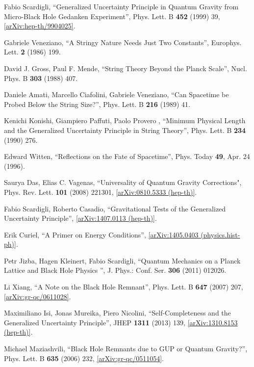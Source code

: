 \documentclass[12pt]{article}
\newcommand{\2}{$^2$}
\newcommand{\3}{$^3$}
\newcommand{\4}{$_4$}
\newcommand{\5}{$_5$}
\begin{document}
\begin{thebibliography}{400}
 Fabio Scardigli, ``Generalized Uncertainty Principle in Quantum Gravity from Micro-Black Hole Gedanken Experiment'', Phys. Lett. B \textbf{452} (1999) 39, \href{http://arxiv.org/abs/hep-th/9904025}{[arXiv:hep-th/9904025]}. 

 Gabriele Veneziano, ``A Stringy Nature Needs Just Two Constants'', Europhys. Lett. \textbf{2} (1986) 199. 

 David J. Gross, Paul F. Mende, ``String Theory Beyond the Planck Scale'', Nucl. Phys. B \textbf{303} (1988) 407.

 Daniele Amati, Marcello Ciafolini, Gabriele Veneziano, ``Can Spacetime be Probed Below the String Size?'', Phys. Lett. B \textbf{216} (1989) 41.

 Kenichi Konishi, Giampiero Paffuti, Paolo Provero , ``Minimum Physical Length and the Generalized Uncertainty Principle in String Theory'', Phys. Lett. B \textbf{234} (1990) 276.

 Edward Witten, ``Reflections on the Fate of Spacetime'', Phys. Today \textbf{49},  Apr. 24 (1996). 

 Saurya Das, Elias C. Vagenas, ``Universality of Quantum Gravity Corrections", Phys.
Rev. Lett. \textbf{101} (2008) 221301, \href{http://arxiv.org/abs/0810.5333}{[arXiv:0810.5333 (hep-th)]}.

Fabio Scardigli, Roberto Casadio, ``Gravitational Tests of the Generalized Uncertainty Principle'', \href{http://arxiv.org/abs/1407.0113}{[arXiv:1407.0113 (hep-th)]}.

Erik Curiel, ``A Primer on Energy Conditions'', \href{http://arxiv.org/abs/1405.0403}{[arXiv:1405.0403 (physics.hist-ph)]}.

Petr Jizba, Hagen Kleinert, Fabio Scardigli, ``Quantum Mechanics on a Planck Lattice and Black Hole Physics '', J. Phys.: Conf. Ser. \textbf{306} (2011) 012026.

Li Xiang, ``A Note on the Black Hole Remnant'', Phys. Lett. B \textbf{647} (2007) 207, \href{http://arxiv.org/abs/gr-qc/0611028}{[arXiv:gr-qc/0611028]}.

Maximiliano Isi, Jonas Mureika, Piero Nicolini, ``Self-Completeness and the Generalized Uncertainty Principle'', JHEP \textbf{1311} (2013) 139, \href{http://arxiv.org/abs/arXiv:1310.8153}{[arXiv:1310.8153 (hep-th)]}.


Michael Maziashvili, ``Black Hole Remnants due to GUP or Quantum Gravity?'', Phys. Lett. B \textbf{635} (2006) 232, \href{http://arxiv.org/abs/gr-qc/0511054}{[arXiv:gr-qc/0511054]}. 


\end{thebibliography}
\end{document}
